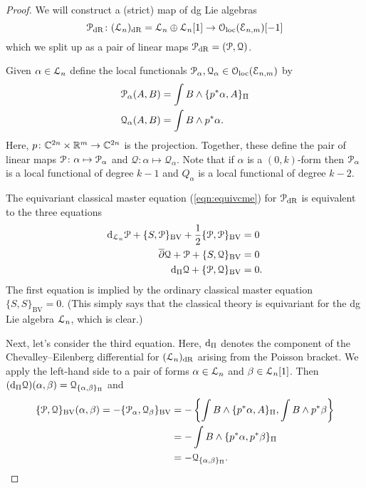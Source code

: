 \documentclass[11pt, oneside, reqno]{amsart}
\theoremstyle{definition} \newtheorem{definition}{Definition}[section]
\theoremstyle{definition}
\theoremstyle{remark}
\theoremstyle{definition} \newtheorem{remark}[definition]{Remark}
\theoremstyle{definition} \newtheorem{remarks}[definition]{Remarks}
\theoremstyle{definition} \newtheorem{question}[definition]{Question}
\theoremstyle{definition} \newtheorem*{note}{Note}
\theoremstyle{definition} \newtheorem{example}[definition]{Example}
\theoremstyle{definition} \newtheorem{examples}[definition]{Examples}
\def\oloc{\mathcal{O}_{\rm loc}}
\def\cE{\mathcal E}\def\cF{\mathcal F}\def\cG{\mathcal G}\def\cH{\mathcal H}
\def\cQ{\mathcal Q}\def\cR{\mathcal R}\def\cS{\mathcal S}\def\cT{\mathcal T}
\newcommand{\dbar}{\overline{\partial}}
\newcommand{\mr}[1]{\mathrm{#1}}
\def\d{{\rm d}}
\newcommand{\dR}{\mathrm{dR}}
\begin{document}
\begin{proof}
We will construct a (strict) map of dg Lie algebras 
\[
\cP_{\dR} \colon (\cL_n)_{\rm dR} = \cL_n \oplus \cL_n [1] \to \oloc(\cE_{n,m}) [-1]
\]
which we split up as a pair of linear maps $\cP_{\dR} = (\cP, \cQ)$. 

Given $\alpha \in \mathcal L_{n}$ define the local functionals $\cP_\alpha, \cQ_\alpha \in \oloc(\cE_{n,m})$ by
\begin{align}
\cP_\alpha (A,B) & = \int B \wedge \{p^* \alpha, A\}_\Pi \\
\cQ_\alpha (A,B) & = \int B \wedge p^* \alpha . \label{eqn:Q}
\end{align}
Here, $p \colon \mathbb C^{2n} \times \mathbb R^m \to \mathbb C^{2n}$ is the projection.
Together, these define the pair of linear maps $\mathcal P \colon \alpha \mapsto \mathcal P_\alpha$ and $\cQ \colon \alpha \mapsto \cQ_\alpha$. 
Note that if $\alpha$ is a $(0,k)$-form then $\mathcal P_\alpha$ is a local functional of degree $k-1$ and $Q_\alpha$ is a local functional of degree $k-2$. 

The equivariant classical master equation (\ref{eqn:equivcme}) for $\mathcal P_{\rm dR}$ is equivalent to the three equations
\begin{align*}
\d_{\cL_n} \cP + \{S, \cP\}_{\mr{BV}} + \frac{1}{2} \{\cP, \cP\}_{\mr{BV}} & = 0 \\
\dbar \cQ + \cP + \{S, \cQ\}_{\mr{BV}} & = 0  \\
\d_{\Pi} \cQ + \{\cP, \cQ\}_{\mr{BV}} & = 0 .
\end{align*}
The first equation is implied by the ordinary classical master equation $\{S, S\}_{\mr{BV}} = 0$.
(This simply says that the classical theory is equivariant for the dg Lie algebra $\mathcal L_n$, which is clear.)

Next, let's consider the third equation.
Here, $\d_{\Pi}$ denotes the component of the Chevalley--Eilenberg differential for $(\mathcal L_n)_{\rm dR}$ arising from the Poisson bracket. 
We apply the left-hand side to a pair of forms $\alpha \in \mathcal L_n$ and $\beta \in \mathcal L_n [1]$. 
Then $(\d_\Pi \cQ)(\alpha,\beta) = \cQ_{\{\alpha, \beta\}_\Pi}$
and 
\begin{align*}
\{\cP, \cQ\}_{\mr{BV}}(\alpha, \beta) = - \{\cP_\alpha, \cQ_\beta\}_{\mr{BV}} & = - \left\{\int B \wedge \{p^* \alpha, A\}_\Pi , \int B \wedge p^* \beta \right\} \\ 
& = - \int B \wedge\{p^* \alpha, p^* \beta\}_\Pi \\ & = - \cQ_{\{\alpha,\beta\}_\Pi} .
\end{align*}


\end{proof}
\end{document}
